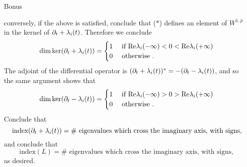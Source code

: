 \documentclass{amsart}
\begin{document}
\begin{clear}{Bonus}
\begin{xca}
  conversely, if the above is satisfied, conclude that ($\ast$)
  defines an element of $W^{1,p}$ in the kernel of
  $\partial_{t}+\lambda_{i}(t)$. Therefore we conclude
  \begin{equation*}
    \dim\ker(\partial_{t}+\lambda_{i}(t))=
    \begin{cases}
      1&\text{ if }\text{Re}\lambda_{i}(-\infty)<0<\text{Re}\lambda_{i}(+\infty)\\
      0&\text{ otherwise }.
    \end{cases}
  \end{equation*}
  The adjoint of the differential operator is
  $(\partial_{t}+\lambda_{i}(t))^{*}=-(\partial_{t}-\lambda_{i}(t))$, and so the same argument shows
  that
  \begin{equation*}
    \dim\ker(\partial_{t}-\lambda_{i}(t))=\begin{cases}
      1&\text{ if }\text{Re}\lambda_{i}(-\infty)>0>\text{Re}\lambda_{i}(+\infty)\\
      0&\text{ otherwise }.
    \end{cases}
  \end{equation*}
  Conclude that
  \begin{equation*}
    \text{index}(\partial_{t}+\lambda_{i}(t))=\#\text{ eigenvalues which
      cross the imaginary axis, with signs},
  \end{equation*}
  and conclude that
  \begin{equation*}
    \text{index}(L)=\#\text{ eigenvalues which
      cross the imaginary axis, with signs},
  \end{equation*}
  as desired.
\end{xca}  
\end{clear}
\end{document}
